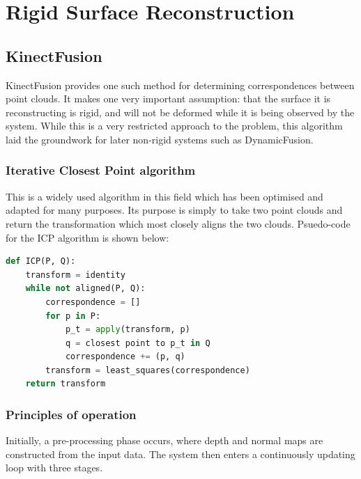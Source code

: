 \documentclass[12pt,twoside]{report}
\begin{document}
\section{Rigid Surface Reconstruction}
\subsection{KinectFusion}

KinectFusion provides one such method for determining correspondences between point clouds. It makes one very important assumption: that the surface it is reconstructing is rigid, and will not be deformed while it is being observed by the system. While this is a very restricted approach to the problem, this algorithm laid the groundwork for later non-rigid systems such as DynamicFusion.

\subsubsection{Iterative Closest Point algorithm}
This is a widely used algorithm in this field which has been optimised and adapted for many purposes. Its purpose is simply to take two point clouds and return the transformation which most closely aligns the two clouds.
Psuedo-code for the ICP algorithm is shown below:

\begin{lstlisting}[language=Python]
def ICP(P, Q):
    transform = identity
    while not aligned(P, Q):
        correspondence = []
        for p in P:
            p_t = apply(transform, p)
            q = closest point to p_t in Q
            correspondence += (p, q)
        transform = least_squares(correspondence)
    return transform
\end{lstlisting}

\subsubsection{Principles of operation}

Initially, a pre-processing phase occurs, where depth and normal maps are constructed from the input data. The system then enters a continuously updating loop with three stages.
\end{document}
